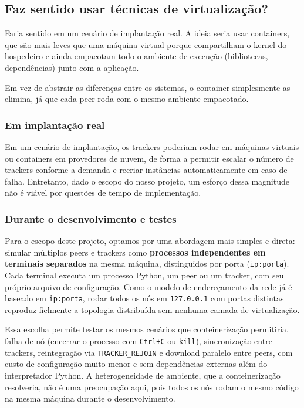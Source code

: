 \documentclass[12pt, a4paper]{article}
\begin{document}
\subsection{Faz sentido usar técnicas de virtualização?}

Faria sentido em um cenário de implantação real. A ideia seria usar containers, que são mais leves que uma máquina virtual porque compartilham o kernel do hospedeiro e ainda empacotam todo o ambiente de execução (bibliotecas, dependências) junto com a aplicação. 

Em vez de abstrair as diferenças entre os sistemas, o container simplesmente as elimina, já que cada peer roda com o mesmo ambiente empacotado.

\subsubsection*{Em implantação real}
Em um cenário de implantação, os trackers poderiam rodar em máquinas virtuais ou containers em provedores de nuvem, de forma a permitir escalar o número de trackers conforme a demanda e recriar instâncias automaticamente em caso de falha. Entretanto, dado o escopo do nosso projeto, um esforço dessa magnitude não é viável por questões de tempo de implementação.

\subsubsection*{Durante o desenvolvimento e testes}
Para o escopo deste projeto, optamos por uma abordagem mais simples e direta: simular múltiplos peers e trackers como \textbf{processos independentes em terminais separados} na mesma máquina, distinguidos por porta (\texttt{ip:porta}). Cada terminal executa um processo Python, um peer ou um tracker, com seu próprio arquivo de configuração. Como o modelo de endereçamento da rede já é baseado em \texttt{ip:porta}, rodar todos os nós em \texttt{127.0.0.1} com portas distintas reproduz fielmente a topologia distribuída sem nenhuma camada de virtualização.

Essa escolha permite testar os mesmos cenários que conteinerização permitiria, falha de nó (encerrar o processo com \texttt{Ctrl+C} ou \texttt{kill}), sincronização entre trackers, reintegração via \texttt{TRACKER\_REJOIN} e download paralelo entre peers, com custo de configuração muito menor e sem dependências externas além do interpretador Python. A heterogeneidade de ambiente, que a conteinerização resolveria, não é uma preocupação aqui, pois todos os nós rodam o mesmo código na mesma máquina durante o desenvolvimento.
\end{document}
